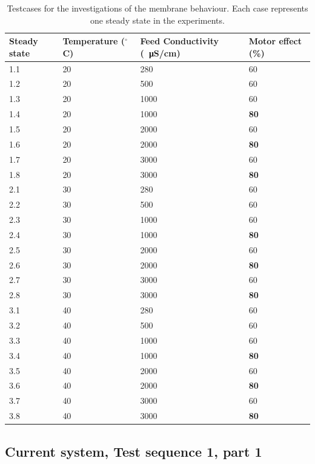 \newpage

\begin{table}[H]
\centering
\begin{tabular}{|p{1.4cm}||p{2cm}|p{3.2cm}|p{1.8cm}|}
 \hline
 \textbf{Steady state }&Temperature  ($^{\circ}$C)&Feed Conductivity (\SI{}{\micro\siemens}/cm)&Motor effect (\%) \\
 \hline
 1.1 & 20 & 280  & 60 \\
 1.2 & 20 & 500  & 60 \\
 1.3 & 20 & 1000 & 60  \\
 1.4 & 20 & 1000 & \textbf{80} \\
 1.5 & 20 & 2000 & 60 \\
 1.6 & 20 & 2000 & \textbf{80}\\
 1.7 & 20 & 3000 & 60 \\
 1.8 & 20 & 3000 & \textbf{80}\\
 \hline
 2.1 & 30 & 280 & 60 \\
 2.2 & 30 & 500 & 60 \\
 2.3 & 30 & 1000 & 60 \\
 2.4 & 30 & 1000 & \textbf{80}\\
 2.5 & 30 & 2000 & 60 \\
 2.6 & 30 & 2000 & \textbf{80}\\
 2.7 & 30 & 3000 & 60 \\
 2.8 & 30 & 3000 & \textbf{80}\\
 \hline 
 3.1 & 40 & 280 & 60 \\
 3.2 & 40 & 500 & 60 \\
 3.3 & 40 & 1000 & 60 \\
 3.4 & 40 & 1000 & \textbf{80}\\
 3.5 & 40 & 2000 & 60 \\
 3.6 & 40 & 2000 & \textbf{80}\\
 3.7 & 40 & 3000 & 60 \\
 3.8 & 40 & 3000 & \textbf{80}\\
\hline
\end{tabular}
\caption{Testcases for the investigations of the membrane behaviour. Each case represents one steady state in the experiments.}
    \label{tab:test cases} 
\end{table}


\newpage

\subsection{Current system, Test sequence 1, part 1}

